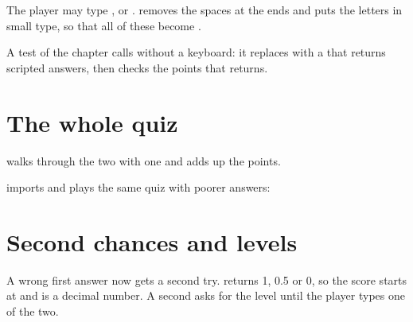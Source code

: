The player may type ,  or .
 removes the spaces at the ends and puts the letters in small
type, so that all of these become .

\label{lst:g7:project-quiz-game:v2}

\label{out:g7:project-quiz-game:v2}

A test of the chapter calls  without a keyboard: it replaces
 with a  that returns scripted answers, then checks the
points that  returns.

\section{The whole quiz}

 walks through the two  with one  and adds up the
points.

\label{lst:g7:project-quiz-game:v3}

\label{out:g7:project-quiz-game:v3}

 imports  and plays the same quiz with poorer
answers:

\label{out:g7:project-quiz-game:v3-poor}

\section{Second chances and levels}

A wrong first answer now gets a second try.  returns 1, 0.5 or 0,
so the score starts at  and is a decimal number. A second 
asks for the level until the player types one of the two.

\label{lst:g7:project-quiz-game:v4}

